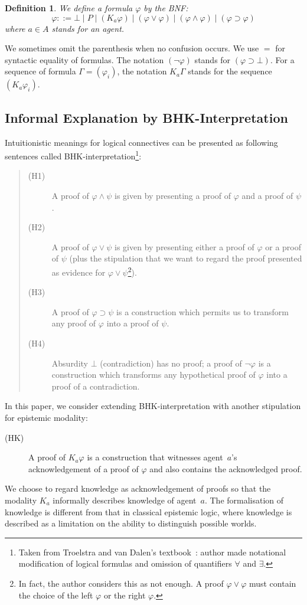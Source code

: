 \documentclass[doctor]{iscs-thesis}
\newtheorem{definition}{Definition}
\begin{document}
\begin{definition}
\label{formula}
 We define a \textit{formula} $\varphi$ by the BNF:
\[
 \varphi ::= \bot\mid P\mid
 (K_a\varphi)\mid(\varphi\vee\varphi)\mid(\varphi\wedge\varphi)\mid
 (\varphi\supset\varphi)
\]
where $a\in A$ stands for an agent.
\end{definition}
We sometimes omit the parenthesis when no confusion occurs. We use $=$ for syntactic
equality of formulas. 
The notation $(\neg \varphi)$ stands for $(\varphi\supset \bot)$.
For a sequence of formula $\Gamma = (\varphi_i)$, the notation $K_a \Gamma$ stands for
the sequence $(K_a \varphi_i)$.

\subsection{Informal Explanation by BHK-Interpretation}
\label{bhk}

Intuitionistic meanings for logical connectives
can be presented as 
following sentences called BHK-interpretation\footnote{
Taken from Troelstra and van Dalen's textbook~\cite[Ch.~1]{troelstra1988constructivism}:
author made notational modification of logical formulas and omission of
quantifiers $\forall$ and $\exists$.
}:
\begin{quotation}
\noindent
\begin{description}
 \item[(H1)] A proof of $\varphi\wedge \psi$ is given by presenting a proof of $\varphi$
	    and a proof of $\psi$.
 \item[(H2)] A proof of $\varphi\vee\psi$ is given by presenting either a proof of
	    $\varphi$ or a proof of $\psi$ (plus the stipulation that we want to regard
	    the proof presented as evidence for $\varphi\vee\psi$\footnote{In fact, the
	    author considers this as not enough. A proof $\varphi\vee\varphi$ must contain
	    the choice of the left $\varphi$ or the right $\varphi$.}).
 \item[(H3)] A proof of $\varphi\supset\psi$ is a construction which permits us to
	    transform any proof of $\varphi$ into a proof of $\psi$.
 \item[(H4)] Absurdity $\bot$ (contradiction) has no proof; a proof of $\neg \varphi$ is a
	    construction which transforms any hypothetical proof of $\varphi$ into a proof
	    of a contradiction.
\end{description}
\end{quotation}
In this paper, we consider extending BHK-interpretation with another stipulation for
epistemic modality:
\begin{description}
 \item[(HK)] A proof of $K_a\varphi$ is a construction that witnesses agent~$a$'s
	    acknowledgement of a proof of $\varphi$ and also contains the acknowledged
	    proof.
\end{description}
We choose to regard knowledge as acknowledgement of proofs so that the modality $K_a$ informally
describes knowledge of agent~$a$.
The formalisation of knowledge is different from that in classical epistemic logic, where
knowledge is described as a limitation on the ability to distinguish possible worlds.
\end{document}
